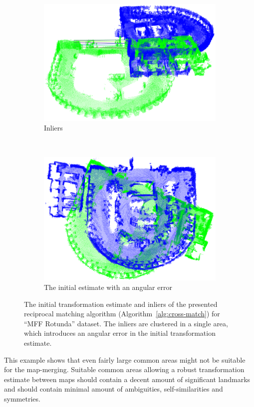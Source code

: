 \begin{figure}
    \centering
    \begin{subfigure}[b]{\textwidth}
        \includegraphics[width=\textwidth]{../img/mff_rotunda_matching_inliers.png}
        \caption{Inliers}
        \label{fig:mff_rotunda_matching_inliers}
    \end{subfigure}
    ~
    \begin{subfigure}[b]{\textwidth}
        \includegraphics[width=\textwidth]{../img/mff_rotunda_matching_estimate.png}
        \caption{The initial estimate with an angular error}
        \label{fig:mff_rotunda_matching_estimate}
    \end{subfigure}
    \caption[The initial estimate for ``MFF Rotunda '' dataset produced by the reciprocal matching]{The initial transformation estimate and inliers of the presented reciprocal matching algorithm (Algorithm~\ref{alg:cross-match}) for ``MFF Rotunda'' dataset. The inliers are clustered in a single area, which introduces an angular error in the initial transformation estimate.}
    \label{fig:mff_rotunda_matching}
\end{figure}

This example shows that even fairly large common areas might not be suitable for the map-merging. Suitable common areas allowing a robust transformation estimate between maps should contain a decent amount of significant landmarks and should contain minimal amount of ambiguities, self-similarities and symmetries.
